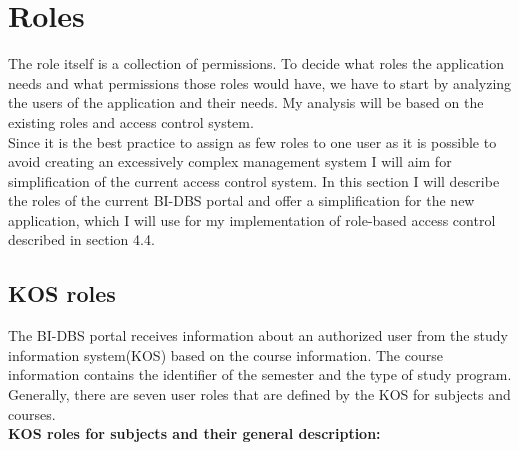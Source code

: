 \section{Roles} The role itself is a collection of permissions. To decide what roles the application needs and what permissions those roles would have, we have to start by analyzing the users of the application and their needs. My analysis will be based on the existing roles and access control system.\\
Since it is the best practice to assign as few roles to one user as it is possible \cite{role-auth} to avoid creating an excessively complex management system I will aim for simplification of the current access control system. In this section I will describe the roles of the current BI-DBS portal and offer a simplification for the new application, which I will use for my implementation of role-based access control described in section 4.4.

\subsection{KOS roles}
The BI-DBS portal receives information about an authorized user from the study information system(KOS) based on the course information. The course information contains the identifier of the semester and the type of study program. Generally, there are seven user roles that are defined by the KOS for subjects and courses.\cite{kosapi}\\

\noindent \textbf{KOS roles for subjects and their general description:\cite{kosroles}}

